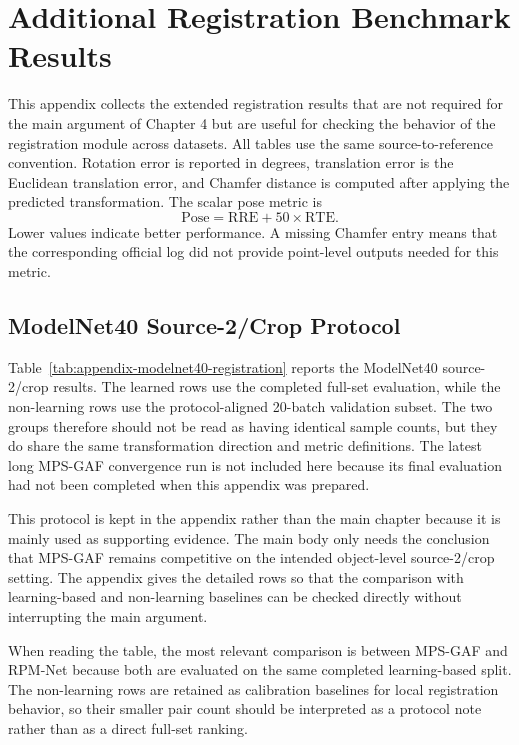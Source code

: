 \chapter{Additional Registration Benchmark Results}
\label{chap:appendix-registration-benchmark}

This appendix collects the extended registration results that are not required for the main argument of Chapter 4 but are useful for checking the behavior of the registration module across datasets. All tables use the same source-to-reference convention. Rotation error is reported in degrees, translation error is the Euclidean translation error, and Chamfer distance is computed after applying the predicted transformation. The scalar pose metric is
\begin{equation}
  \mathrm{Pose}= \mathrm{RRE} + 50 \times \mathrm{RTE}.
\end{equation}
Lower values indicate better performance. A missing Chamfer entry means that the corresponding official log did not provide point-level outputs needed for this metric.

\section{ModelNet40 Source-2/Crop Protocol}

Table~\ref{tab:appendix-modelnet40-registration} reports the ModelNet40 source-2/crop results. The learned rows use the completed full-set evaluation, while the non-learning rows use the protocol-aligned 20-batch validation subset. The two groups therefore should not be read as having identical sample counts, but they do share the same transformation direction and metric definitions. The latest long MPS-GAF convergence run is not included here because its final evaluation had not been completed when this appendix was prepared.

This protocol is kept in the appendix rather than the main chapter because it is mainly used as supporting evidence. The main body only needs the conclusion that MPS-GAF remains competitive on the intended object-level source-2/crop setting. The appendix gives the detailed rows so that the comparison with learning-based and non-learning baselines can be checked directly without interrupting the main argument.

When reading the table, the most relevant comparison is between MPS-GAF and RPM-Net because both are evaluated on the same completed learning-based split. The non-learning rows are retained as calibration baselines for local registration behavior, so their smaller pair count should be interpreted as a protocol note rather than as a direct full-set ranking.

